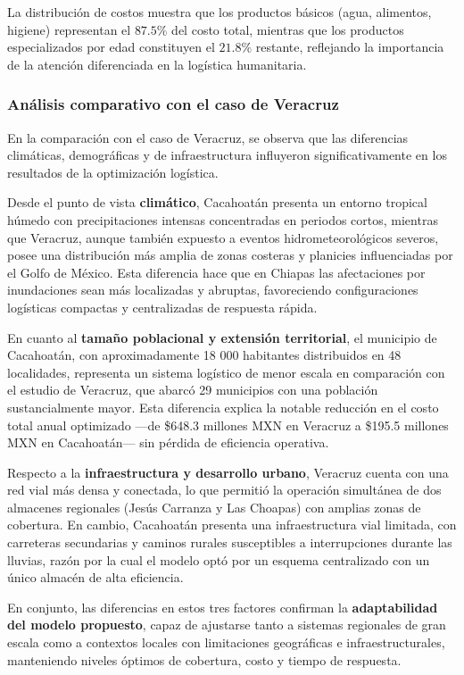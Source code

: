 \documentclass[
  spanish,
  us-letterpaper,
]{scrreprt}
\numberwithin{equation}{chapter} %
\begin{document}
La distribución de costos muestra que los productos básicos (agua,
alimentos, higiene) representan el \(87.5\%\) del costo total, mientras
que los productos especializados por edad constituyen el \(21.8\%\)
restante, reflejando la importancia de la atención diferenciada en la
logística humanitaria.

\subsubsection{Análisis comparativo con el caso de
Veracruz}\label{anuxe1lisis-comparativo-con-el-caso-de-veracruz}

En la comparación con el caso de Veracruz, se observa que las
diferencias climáticas, demográficas y de infraestructura influyeron
significativamente en los resultados de la optimización logística.

Desde el punto de vista \textbf{climático}, Cacahoatán presenta un
entorno tropical húmedo con precipitaciones intensas concentradas en
periodos cortos, mientras que Veracruz, aunque también expuesto a
eventos hidrometeorológicos severos, posee una distribución más amplia
de zonas costeras y planicies influenciadas por el Golfo de México. Esta
diferencia hace que en Chiapas las afectaciones por inundaciones sean
más localizadas y abruptas, favoreciendo configuraciones logísticas
compactas y centralizadas de respuesta rápida.

En cuanto al \textbf{tamaño poblacional y extensión territorial}, el
municipio de Cacahoatán, con aproximadamente 18 000 habitantes
distribuidos en 48 localidades, representa un sistema logístico de menor
escala en comparación con el estudio de Veracruz, que abarcó 29
municipios con una población sustancialmente mayor. Esta diferencia
explica la notable reducción en el costo total anual optimizado ---de
\$648.3 millones MXN en Veracruz a \$195.5 millones MXN en Cacahoatán---
sin pérdida de eficiencia operativa.

Respecto a la \textbf{infraestructura y desarrollo urbano}, Veracruz
cuenta con una red vial más densa y conectada, lo que permitió la
operación simultánea de dos almacenes regionales (Jesús Carranza y Las
Choapas) con amplias zonas de cobertura. En cambio, Cacahoatán presenta
una infraestructura vial limitada, con carreteras secundarias y caminos
rurales susceptibles a interrupciones durante las lluvias, razón por la
cual el modelo optó por un esquema centralizado con un único almacén de
alta eficiencia.

En conjunto, las diferencias en estos tres factores confirman la
\textbf{adaptabilidad del modelo propuesto}, capaz de ajustarse tanto a
sistemas regionales de gran escala como a contextos locales con
limitaciones geográficas e infraestructurales, manteniendo niveles
óptimos de cobertura, costo y tiempo de respuesta.
\end{document}
